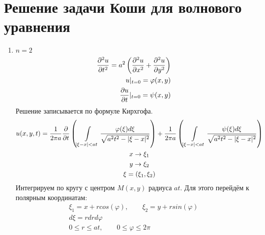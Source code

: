 \documentclass[../main.tex]{subfiles}
\begin{document}
\section{Решение задачи Коши для волнового уравнения}
\begin{enumerate}
    \item $n=2$
\begin{equation}
    \label{eq:2.7.1}
    \begin{split}
    \frac{\partial ^2u}{\partial t^2} = a^2\left(\frac{\partial ^2u}{\partial x^2}+\frac{\partial ^2u}{\partial y^2}\right)\\
    u|_{t=0} = \varphi(x,y)\\
    \frac{\partial u}{\partial t}|_{t=0} = \psi(x,y)
    \end{split}
\end{equation}
Решение записывается по формуле Кирхгофа.
\begin{gather*}
    u(x,y,t) = \frac{1}{2\pi a}\frac{\partial  }{\partial t}\left(
    \int\displaylimits_{|\xi-x|<at} \frac{\varphi(\xi)d\xi}{\sqrt{a^2t^2 - |\xi-x|^2}}\right)
    +
    \frac{1}{2\pi a}\left(
    \int\displaylimits_{|\xi-x|<at} \frac{\psi(\xi)d\xi}{\sqrt{a^2t^2 - |\xi-x|^2}}\right)\\
    x \rightarrow \xi_1\\
    y \rightarrow \xi_2\\
    \xi = (\xi_1,\xi_2)
\end{gather*}
Интегрируем по кругу с центром $M(x,y)$ радиуса $at$. Для этого перейдём к
полярным координатам:
\begin{gather*}
    \xi_1 = x + r cos(\varphi), \qquad \xi_2 = y + r sin(\varphi)\\
    d\xi = r dr d\varphi \\
    0 \leq r \leq at, \qquad 0 \leq \varphi \leq 2\pi
\end{gather*}


\end{enumerate}
\end{document}
